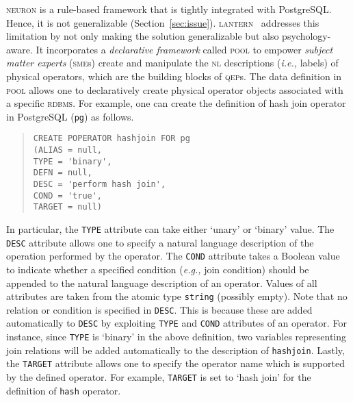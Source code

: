 \documentclass[11pt]{article}
\newcommand{\ie}{\emph{i.e.,}\xspace}
\newcommand{\eg}{\emph{e.g.,}\xspace}
\begin{document}
\textsc{neuron} is a rule-based framework that is tightly integrated with PostgreSQL. Hence, it is not generalizable (Section~\ref{sec:issue}).  \textsc{lantern}~\cite{lantern,lantern-demo,lantern-soft} addresses this limitation by not only making the solution generalizable but also psychology-aware. It incorporates a \textit{declarative framework} called \textsc{pool} to empower \textit{subject matter experts} (\textsc{sme}s) create and manipulate the \textsc{nl} descriptions (\ie labels) of physical operators, which are the building blocks of \textsc{qep}s. The data definition in \textsc{pool} allows one to declaratively create physical operator objects associated with a specific \textsc{rdbms}. For example, one can create the definition of hash join operator in PostgreSQL (\texttt{pg}) as follows.

\begin{quote}
\begin{verbatim}
CREATE POPERATOR hashjoin FOR pg
(ALIAS = null,
TYPE = 'binary',
DEFN = null,
DESC = 'perform hash join',
COND = 'true',
TARGET = null)
\end{verbatim}
\end{quote}

In particular, the \texttt{TYPE} attribute can take either \textsf{`unary'} or \textsf{`binary'} value. The \texttt{DESC} attribute allows one to specify a natural language description of the operation performed by the operator.   The \texttt{COND} attribute takes a Boolean value to indicate whether a specified condition (\eg join condition) should be appended to the natural language description of an operator. Values of all attributes are taken from the atomic type \texttt{string} (possibly empty). Note that no relation or condition is specified in \texttt{DESC}. This is because these are added automatically to \texttt{DESC} by exploiting \texttt{TYPE} and \texttt{COND} attributes  of an operator. For instance, since \texttt{TYPE} is \textsf{`binary'} in the above definition, two variables representing join relations will be added automatically to the description of \texttt{hashjoin}.  Lastly, the \texttt{TARGET} attribute allows one to specify the operator name which is supported by the defined operator. For example, \texttt{TARGET} is set to \textsf{`hash join'} for the definition of \texttt{hash} operator.
\end{document}
